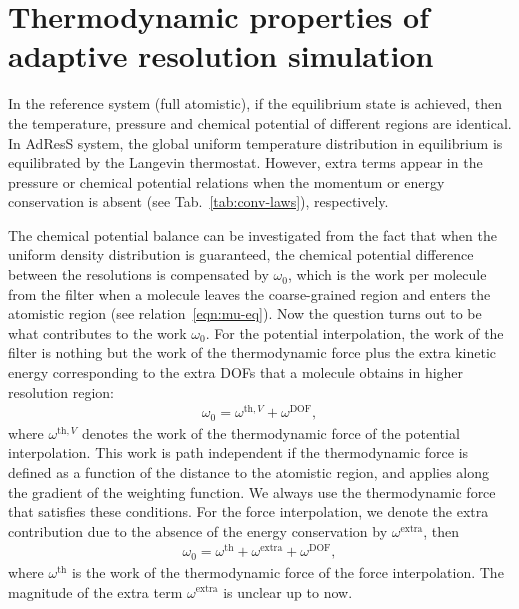 \documentclass[epjST]{svjour}
\newcommand{\thf}{{\textrm{th}}}
\newcommand{\dof}{{\textrm{DOF}}}
\newcommand{\exc}{{\textrm{extra}}}
\begin{document}
      



\section{Thermodynamic properties of adaptive resolution simulation}
\label{sec:thermodynamic}

In the reference system (full atomistic), if the equilibrium state is achieved, then
the temperature, pressure and chemical potential of different regions are identical.
In AdResS system, the global uniform
temperature distribution in equilibrium is equilibrated by the Langevin
thermostat.  However, extra terms appear in the pressure or chemical
potential relations when the momentum or energy conservation is absent
(see Tab.~\ref{tab:conv-laws}), respectively.

The chemical potential balance can be investigated from the fact that
when the uniform density distribution is guaranteed, the chemical potential
difference between the resolutions is compensated by $\omega_0$, which
is the work per molecule from the filter when a molecule leaves the
coarse-grained region and enters the atomistic region (see
relation~\eqref{eqn:mu-eq}).  Now the question turns out to be what
contributes to the work $\omega_0$.  For the potential interpolation,
the work of the filter is nothing but the work of the thermodynamic
force plus the extra kinetic energy corresponding to the extra DOFs
that a molecule obtains in higher resolution region:
\begin{align}\label{eqn:mu0-v}
  \omega_0 = \omega^{\thf,V} + \omega^\dof,
\end{align}
where $ \omega^{\thf,V}$ denotes the work of the thermodynamic force
of the potential interpolation.
This work is path independent if the thermodynamic force is defined as a function of the distance to the atomistic region, and applies along the gradient of the weighting function.
We always use the thermodynamic force that satisfies these conditions.
For the force interpolation, 
we denote the extra contribution due to the absence of the energy conservation
by $\omega^\exc$, then
\begin{align}\label{eqn:mu0-f}
  \omega_0 = \omega^{\thf} + \omega^\exc + \omega^\dof,
\end{align}
where $\omega^{\thf}$ is the work of the thermodynamic force of the force interpolation.
The magnitude of the extra term $\omega^\exc$ is unclear up to now.
\end{document}
